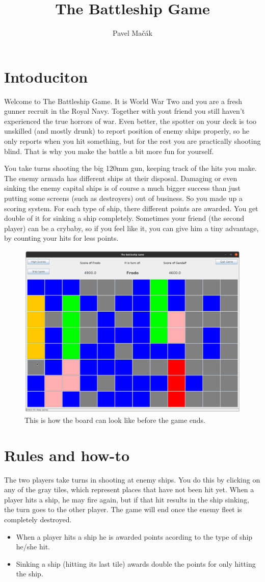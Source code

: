 \documentclass[]{article}
\title{The Battleship Game}
\author{Pavel Mačák}
\begin{document}
\maketitle

\section{Intoduciton}

Welcome to The Battleship Game. It is World War Two and you are a fresh gunner recruit in the Royal Navy. Together with yout friend you still haven't experienced the true horrors of war. Even better, the spotter on your deck is too unskilled (and mostly drunk) to report position of enemy ships properly, so he only reports when you hit something, but for the rest you are practically shooting blind. That is why you make the battle a bit more fun for yourself.

You take turns shooting the big 120mm gun, keeping track of the hits you make. The enemy armada has different ships at their disposal. Damaging or even sinking the enemy capital ships is of course a much bigger success than just putting some screens (such as destroyers) out of business. So you made up a scoring system. For each type of ship, there different points are awarded. You get double of it for sinking a ship completely. Sometimes your friend (the second player) can be a crybaby, so if you feel like it, you can give him a tiny advantage, by counting your hits for less points.


\begin{figure}
	\centering
	\includegraphics[width=0.5\linewidth]{figs/boardScreen}
	\caption{This is how the board can look like before the game ends.}
	\label{fig:boardscreen}
\end{figure}

\section{Rules and how-to}
The two players take turns in shooting at enemy ships. You do this by clicking on any of the gray tiles, which represent places that have not been hit yet. When a player hits a ship, he may fire again, but if that hit results in the ship sinking, the turn goes to the other player. The game will end once the enemy fleet is completely destroyed.
\begin{itemize}
	\item When a player hits a ship he is awarded points acording to the type of ship he/she hit.
	\item Sinking a ship (hitting its last tile) awards double the points for only hitting the ship.
\end{itemize}
\end{document}
